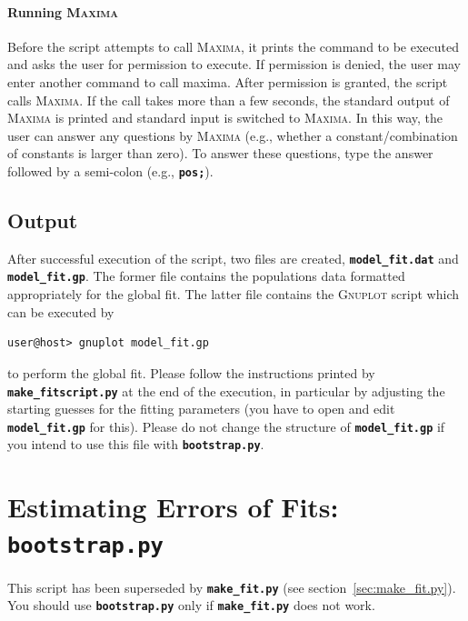 \documentclass[a4paper,10pt,DIV=15,openany]{scrbook}
\newcommand{\ttt}[1]{\textbf{\texttt{#1}}}
\begin{document}
\paragraph{Running \textsc{Maxima}}

Before the script attempts to call \textsc{Maxima}, it prints the command to be executed and asks the user for permission to execute.
If permission is denied, the user may enter another command to call maxima.
After permission is granted, the script calls \textsc{Maxima}.
If the call takes more than a few seconds, the standard output of \textsc{Maxima} is printed and standard input is switched to \textsc{Maxima}.
In this way, the user can answer any questions by \textsc{Maxima} (e.g., whether a constant/combination of constants is larger than zero).
To answer these questions, type the answer followed by a semi-colon (e.g., \ttt{pos;}).

\subsection{Output}

After successful execution of the script, two files are created, \ttt{model\_fit.dat} and \ttt{model\_fit.gp}.
The former file contains the populations data formatted appropriately for the global fit.
The latter file contains the \textsc{Gnuplot} script which can be executed by
\begin{verbatim}
user@host> gnuplot model_fit.gp
\end{verbatim}
to perform the global fit.
Please follow the instructions printed by \ttt{make\_fitscript.py} at the end of the execution, in particular by adjusting the starting guesses for the fitting parameters (you have to open and edit \ttt{model\_fit.gp} for this).
Please do not change the structure of \ttt{model\_fit.gp} if you intend to use this file with \ttt{bootstrap.py}.



\section{Estimating Errors of Fits: \ttt{bootstrap.py}}\label{sec:bootstrap.py}

This script has been superseded by \ttt{make\_fit.py} (see section~\ref{sec:make_fit.py}).
You should use \ttt{bootstrap.py} only if \ttt{make\_fit.py} does not work.
\end{document}
